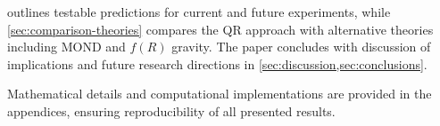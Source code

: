  outlines testable predictions for current and future experiments, while \cref{sec:comparison-theories} compares the QR approach with alternative theories including MOND and $f(R)$ gravity. The paper concludes with discussion of implications and future research directions in \cref{sec:discussion,sec:conclusions}.

Mathematical details and computational implementations are provided in the appendices, ensuring reproducibility of all presented results.